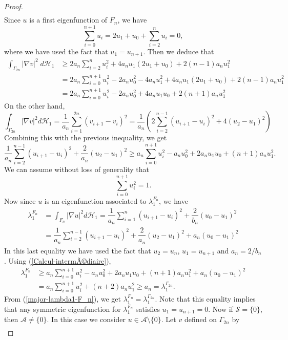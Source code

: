 \documentclass[12pt,english]{smfart} %
\theoremstyle{remark}
\begin{document}
\begin{proof}
\begin{align*}
\end{align*}
Since $u$ is a first eigenfunction of $F_n$, we have 
$$\sum_{i=0}^{n+1}u_i=2u_1+u_0+\sum_{i=2}^{n}u_i=0,$$
where we have used the fact that $u_1=u_{n+1}$. Then we deduce that 
\begin{align*}
\int_{\Gamma_{2n}}|\nabla v|^2\;d\mathcal{H}_1&\geqslant2a_n\sum_{i=2}^{n}u_i^2+4a_nu_1(2u_1+u_0)+2(n-1)a_nu_1^2\\
&=2a_n\sum_{i=0}^{n+1}u_i^2-2a_nu_0^2-4a_nu_1^2+4a_nu_1(2u_1+u_0)+2(n-1)a_nu_1^2\\
&=2a_n\sum_{i=0}^{n+1}u_i^2-2a_nu_0^2+4a_nu_1u_0+2(n+1)a_nu_1^2\end{align*}
On the other hand,
$$\int_{\Gamma_{2n}}|\nabla v|^2d\mathcal{H}_1=\frac{1}{a_n}\sum_{i=1}^{2n}(v_{i+1}-v_i)^2=\frac{1}{a_n}\left(2\sum_{i=2}^{n-1}(u_{i+1}-u_i)^2+4(u_2-u_1)^2\right)$$
Combining this with the previous inequality, we get 
\begin{equation}\label{Calcul-intermÃ©diaire}
\frac{1}{a_n}\sum_{i=2}^{n-1}(u_{i+1}-u_i)^2+\dfrac{2}{a_n}(u_2-u_1)^2\geqslant a_n\sum_{i=0}^{n+1}u_i^2-a_nu_0^2+2a_nu_1u_0+(n+1)a_nu_1^2.
\end{equation}
We can assume without loss of generality that $$\displaystyle\sum_{i=0}^{n+1}u_i^2=1.$$ Now since $u$ is an eigenfunction associated to $\lambda_1^{F_n}$, we have
\begin{align*}
\lambda_1^{F_n}&= \displaystyle\int_{F_n}|\nabla u|^2d\mathcal{H}_1=\dfrac{1}{a_n}\displaystyle\sum_{i=1}^n(u_{i+1}-u_i)^2+\dfrac{2}{b_n}(u_0-u_1)^2\\
&= \dfrac{1}{a_n}\displaystyle\sum_{i=2}^{n-1}(u_{i+1}-u_i)^2+\dfrac{2}{a_n}(u_2-u_1)^2+a_n(u_0-u_1)^2
\end{align*}
In this last equality we have used the fact that $u_2=u_n$, $u_1=u_{n+1}$ and $a_n=2/b_n$. Using (\ref{Calcul-intermÃ©diaire}),
\begin{align*}
\lambda_1^{F_n}&\geqslant a_n\displaystyle\sum_{i=0}^{n+1}u_i^2-a_nu_0^2+2a_nu_1u_0+(n+1)a_nu_1^2+a_n(u_0-u_1)^2\\
&=a_n\displaystyle\sum_{i=0}^{n+1}u_i^2+(n+2)a_nu_1^2 \geqslant a_n=\lambda_1^{\Gamma_{2n}}.
\end{align*}
From (\ref{major-lambda1-F_n}), we get $\lambda_1^{F_n}=\lambda_1^{\Gamma_{2n}}$. Note that this equality implies that any symmetric eigenfunction for $\lambda_1^{F_n}$ satisfies $u_1=u_{n+1}=0$. Now if $\mathcal{S}=\{0\}$, then $\mathcal{A}\neq\{0\}$. In this case we consider $u\in\mathcal{A}\setminus\{0\}$. Let $v$ defined on $\Gamma_{2n}$ by
\begin{align*}

\end{align*}
\end{proof}
\end{document}
